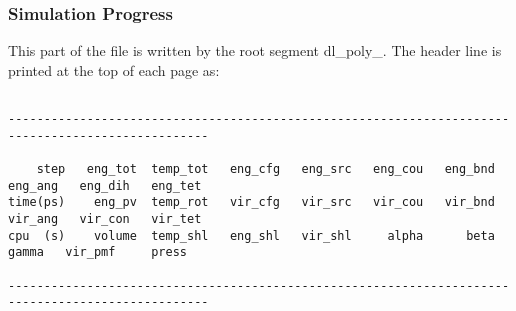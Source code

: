 \subsubsection{Simulation Progress}

This part of the file is written by the \D root segment {\sc
dl\_poly\_}.  The header line is printed at the top of each page
as:

{\scriptsize\begin{lstlisting}

--------------------------------------------------------------------------------------------------

    step   eng_tot  temp_tot   eng_cfg   eng_src   eng_cou   eng_bnd   eng_ang   eng_dih   eng_tet
time(ps)    eng_pv  temp_rot   vir_cfg   vir_src   vir_cou   vir_bnd   vir_ang   vir_con   vir_tet
cpu  (s)    volume  temp_shl   eng_shl   vir_shl     alpha      beta     gamma   vir_pmf     press

--------------------------------------------------------------------------------------------------
\end{lstlisting}}

